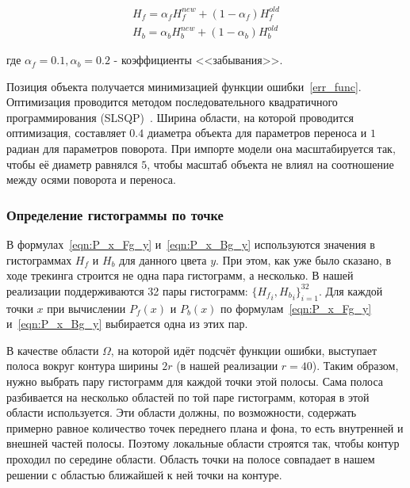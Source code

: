 \begin{equation}
\begin{array}{c}
H_{f} = \alpha_f H_{f}^{new} + (1 - \alpha_f) H_f^{old} \\
H_{b} = \alpha_b H_{b}^{new} + (1 - \alpha_b) H_b^{old}
\end{array}
\end{equation}

где $\alpha_f = 0.1, \alpha_b = 0.2$ - коэффициенты <<забывания>>.

Позиция объекта получается минимизацией функции ошибки~\ref{err_func}.
Оптимизация проводится методом последовательного квадратичного программирования (SLSQP)~\cite{SLSQP}.
Ширина области, на которой проводится оптимизация, составляет $0.4$ диаметра объекта для параметров переноса и $1$ радиан для параметров поворота.
При импорте модели она масштабируется так, чтобы её диаметр равнялся $5$, чтобы масштаб объекта не влиял на соотношение между осями поворота и переноса.



\subsubsection*{Определение гистограммы по точке}
В формулах~\ref{eqn:P_x_Fg_y} и~\ref{eqn:P_x_Bg_y} используются значения в гистограммах $H_f$ и $H_b$ для данного цвета $y$.
При этом, как уже было сказано, в ходе трекинга строится не одна пара гистограмм, а несколько.
В нашей реализации поддерживаются 32 пары гистограмм: $\{{H_f}_i, {H_b}_i\}_{i = 1}^{32}$.
Для каждой точки $x$ при вычислении $P_f(x)$ и $P_b(x)$ по формулам~\ref{eqn:P_x_Fg_y} и~\ref{eqn:P_x_Bg_y} выбирается одна из этих пар.

В качестве области $\Omega$, на которой идёт подсчёт функции ошибки, выступает полоса вокруг контура ширины $2r$ (в нашей реализации $r = 40$).
Таким образом, нужно выбрать пару гистограмм для каждой точки этой полосы.
Сама полоса разбивается на несколько областей по той паре гистограмм, которая в этой области используется.
Эти области должны, по возможности, содержать примерно равное количество точек переднего плана и фона, то есть внутренней и внешней частей полосы.
Поэтому локальные области строятся так, чтобы контур проходил по середине области.
Область точки на полосе совпадает в нашем решении с областью ближайшей к ней точки на контуре.

